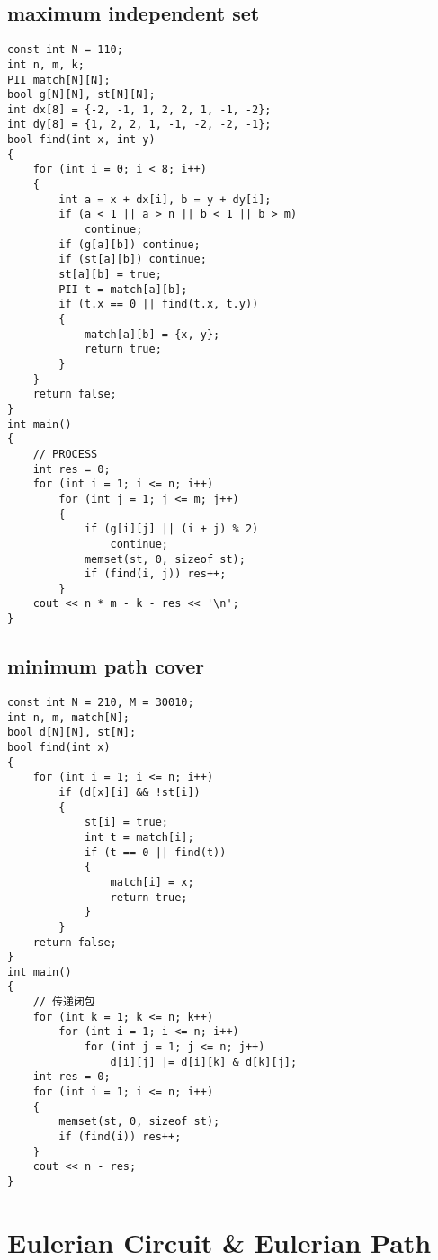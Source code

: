 \subsection{maximum independent set}
\begin{lstlisting}
const int N = 110;
int n, m, k;
PII match[N][N];
bool g[N][N], st[N][N];
int dx[8] = {-2, -1, 1, 2, 2, 1, -1, -2};
int dy[8] = {1, 2, 2, 1, -1, -2, -2, -1};
bool find(int x, int y)
{
    for (int i = 0; i < 8; i++)
    {
        int a = x + dx[i], b = y + dy[i];
        if (a < 1 || a > n || b < 1 || b > m)
            continue;
        if (g[a][b]) continue;
        if (st[a][b]) continue;
        st[a][b] = true;
        PII t = match[a][b];
        if (t.x == 0 || find(t.x, t.y))
        {
            match[a][b] = {x, y};
            return true;
        }
    }
    return false;
}
int main()
{
    // PROCESS
    int res = 0;
    for (int i = 1; i <= n; i++)
        for (int j = 1; j <= m; j++)
        {
            if (g[i][j] || (i + j) % 2)
                continue;
            memset(st, 0, sizeof st);
            if (find(i, j)) res++;
        }
    cout << n * m - k - res << '\n';
}
\end{lstlisting}
\subsection{minimum path cover}
\begin{lstlisting}
const int N = 210, M = 30010;
int n, m, match[N];
bool d[N][N], st[N];
bool find(int x)
{
    for (int i = 1; i <= n; i++)
        if (d[x][i] && !st[i])
        {
            st[i] = true;
            int t = match[i];
            if (t == 0 || find(t))
            {
                match[i] = x;
                return true;
            }
        }
    return false;
}
int main()
{
    // 传递闭包
    for (int k = 1; k <= n; k++)
        for (int i = 1; i <= n; i++)
            for (int j = 1; j <= n; j++)
                d[i][j] |= d[i][k] & d[k][j];
    int res = 0;
    for (int i = 1; i <= n; i++)
    {
        memset(st, 0, sizeof st);
        if (find(i)) res++;
    }
    cout << n - res;
}
\end{lstlisting}
\section{Eulerian Circuit \& Eulerian Path}
